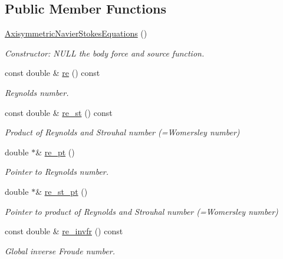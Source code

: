 \subsection*{Public Member Functions}
\begin{DoxyCompactItemize}
\item 
\hyperlink{classoomph_1_1AxisymmetricNavierStokesEquations_a639d6998fea9b62d0341b8ae6547aecf}{Axisymmetric\+Navier\+Stokes\+Equations} ()
\begin{DoxyCompactList}\small\item\em Constructor\+: N\+U\+LL the body force and source function. \end{DoxyCompactList}\item 
const double \& \hyperlink{classoomph_1_1AxisymmetricNavierStokesEquations_a5326eb9f37e9ca42103ea7c72622a415}{re} () const
\begin{DoxyCompactList}\small\item\em Reynolds number. \end{DoxyCompactList}\item 
const double \& \hyperlink{classoomph_1_1AxisymmetricNavierStokesEquations_aa951cf371f58231f3c0967255843a50a}{re\+\_\+st} () const
\begin{DoxyCompactList}\small\item\em Product of Reynolds and Strouhal number (=Womersley number) \end{DoxyCompactList}\item 
double $\ast$\& \hyperlink{classoomph_1_1AxisymmetricNavierStokesEquations_a783cd0439da3951032dcf984d7c98433}{re\+\_\+pt} ()
\begin{DoxyCompactList}\small\item\em Pointer to Reynolds number. \end{DoxyCompactList}\item 
double $\ast$\& \hyperlink{classoomph_1_1AxisymmetricNavierStokesEquations_a64f354d90dcae78352e08b369a4c2a02}{re\+\_\+st\+\_\+pt} ()
\begin{DoxyCompactList}\small\item\em Pointer to product of Reynolds and Strouhal number (=Womersley number) \end{DoxyCompactList}\item 
const double \& \hyperlink{classoomph_1_1AxisymmetricNavierStokesEquations_aab647203e95cec99d25d42cee76a5e38}{re\+\_\+invfr} () const
\begin{DoxyCompactList}\small\item\em Global inverse Froude number. \end{DoxyCompactList}\item 

\end{DoxyCompactItemize}
